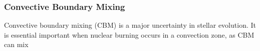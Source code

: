 {\color{purple}
\subsubsection{Convective Boundary Mixing}
}


Convective boundary mixing (CBM) is a major uncertainty in stellar evolution. It is essential important when nuclear burning occurs in a convection zone, as CBM can mix

